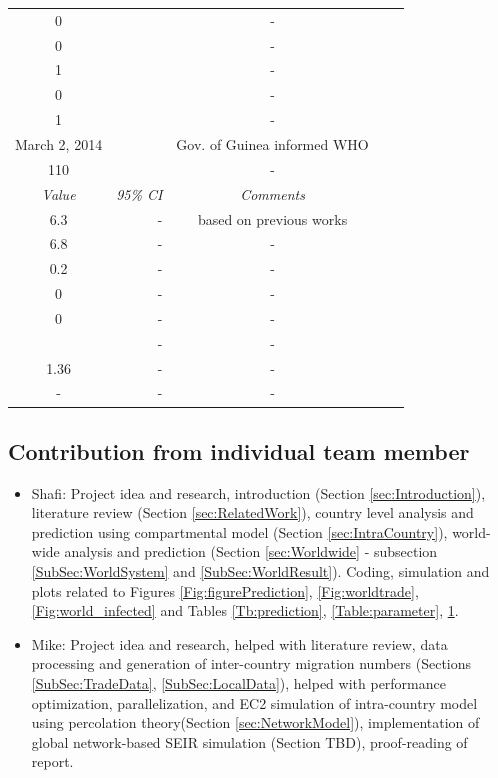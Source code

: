 \documentclass[10pt, journal,onecolumn]{IEEEtran}
\begin{document}
\begin{appendix}
\begin{table}[h]
{\begin{tabular}{@{}crccc@{}}
 0& & -\\
 0& & -\\
 1& & -\\
 0& & -\\
 1& &-\\
 March 2, 2014 &  & Gov. of Guinea informed WHO\\
110 & & -\\
\midrule
 \textit{Value} & \textit{95\% CI} & \textit{Comments} \\
\midrule
6.3 & - & based on previous works \cite{}\\
6.8 & - & -\\
0.2 & - & -\\
0 & - & -\\
0 & - & -\\
 & - & -\\
1.36 &- &-\\
- & - &-\\
\end{tabular}
}
\label{Table:parameter2}
\end{table}




\subsection*{Contribution from individual team member}
\begin{itemize}
\item{Shafi: } Project idea and research, introduction (Section \ref{sec:Introduction}), literature review (Section \ref{sec:RelatedWork}), country level analysis and prediction using compartmental model (Section \ref{sec:IntraCountry}), world-wide analysis and prediction (Section \ref{sec:Worldwide} - subsection \ref{SubSec:WorldSystem} and \ref{SubSec:WorldResult}). Coding, simulation and plots related to Figures \ref{Fig:figurePrediction}, \ref{Fig:worldtrade}, \ref{Fig:world_infected} and Tables \ref{Tb:prediction}, \ref{Table:parameter}, \ref{Table:parameter2}.

\item{Mike: } Project idea and research, helped with literature review, data processing and generation of inter-country migration numbers (Sections \ref{SubSec:TradeData}, \ref{SubSec:LocalData}), helped with performance optimization, parallelization, and EC2 simulation of intra-country model using percolation theory(Section \ref{sec:NetworkModel}), implementation of global network-based SEIR simulation (Section TBD), proof-reading of report.


\end{itemize}
\end{appendix}
\end{document}
